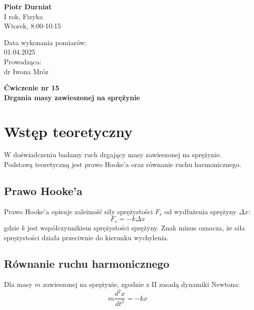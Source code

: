 \documentclass[a4paper,12pt]{article}
\begin{document}
\noindent
\begin{minipage}{0.5\textwidth}
    \raggedright
    \textbf{Piotr Durniat} \\
    I rok, Fizyka \\
    Wtorek, 8:00-10:15 \\
    \vspace{0.5cm}
    \vspace{0.5cm}
\end{minipage}%
\begin{minipage}{0.5\textwidth}
    \raggedleft
    Data wykonania pomiarów: \\
    01.04.2025 \\
    \vspace{0.5cm} %
    Prowadząca: \\
    dr Iwona Mróz
\end{minipage}

\vspace{2cm} %
\begin{center}
    \LARGE \textbf{Ćwiczenie nr 15} \\[0.5cm]
    \Large \textbf{Drgania masy zawieszonej na sprężynie}
\end{center}

\vspace{1cm} %
\noindent

\tableofcontents
\newpage

\section{Wstęp teoretyczny}

W doświadczeniu badamy ruch drgający masy zawieszonej na sprężynie. Podstawą teoretyczną jest prawo Hooke'a oraz równanie ruchu harmonicznego.

\subsection*{Prawo Hooke'a}
Prawo Hooke'a opisuje zależność siły sprężystości $F_s$ od wydłużenia sprężyny $\Delta x$:
\begin{equation}
    F_s = -k\Delta x
\end{equation}
gdzie $k$ jest współczynnikiem sprężystości sprężyny. Znak minus oznacza, że siła sprężystości działa przeciwnie do kierunku wychylenia.

\subsection*{Równanie ruchu harmonicznego}
Dla masy $m$ zawieszonej na sprężynie, zgodnie z II zasadą dynamiki Newtona:
\begin{equation}
    m\frac{d^2x}{dt^2} = -kx
\end{equation}
\end{document}
